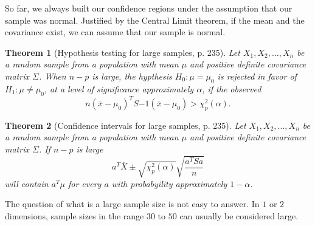 \documentclass[a4paper]{article}
\newtheorem*{theorem}{Theorem}
\begin{document}
So far, we always built our confidence regions under the assumption that our sample was normal. Justified by the Central Limit theorem, if the mean and the covariance exist, we can assume that our sample is normal. 

\begin{theorem}[Hypothesis testing for large samples, p. 235]
	Let $X_1, X_2, ..., X_n$ be a random sample from a population with mean $\mu$ and positive definite covariance matrix $\Sigma$. When $n-p$ is large, the hypthesis $H_0:\mu=\mu_0$ is rejected in favor of $H_1:\mu\ne\mu_0$, at a level of significance approximately $\alpha$, if the observed $$n(\overline{x}-\mu_0)^TS{-1}(\overline{x}-\mu_0)>\chi_p^2(\alpha).$$
\end{theorem}

\begin{theorem}[Confidence intervals for large samples, p. 235]
	Let $X_1, X_2, ..., X_n$ be a random sample from a population with mean $\mu$ and positive definite covariance matrix $\Sigma$. If $n-p$ is large
	$$a^T\overline{X}\pm \sqrt{\chi_p^2(\alpha)}\sqrt{\frac{a^TSa}{n}}$$ will contain $a^T\mu$ for every $a$ with probabyility approximately $1-\alpha$. 
\end{theorem}

The question of what is a large sample size is not easy to answer. In $1$ or $2$ dimensions, sample sizes in the range $30$ to $50$ can usually be considered large. 
\end{document}

